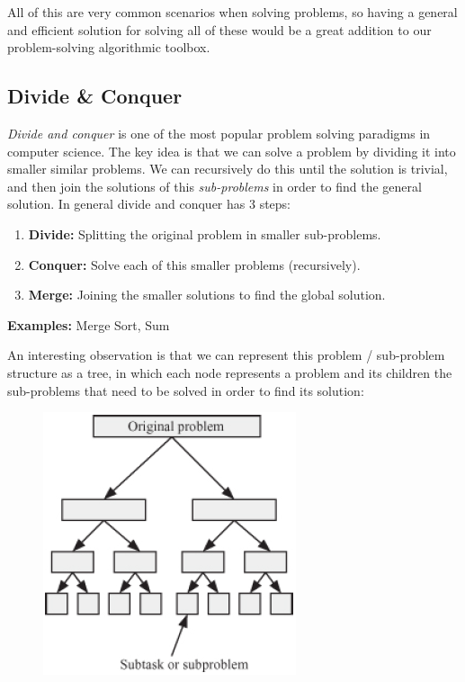 \documentclass{article}
\begin{document}
All of this are very common scenarios when solving problems, so having a general and efficient solution for solving all of these would be a great addition to our problem-solving algorithmic toolbox.

\subsection{Divide \& Conquer}

\textit{Divide and conquer} is one of the most popular problem solving paradigms in computer science. The key idea is that we can solve a problem by dividing it into smaller similar problems. We can recursively do this until the solution is trivial, and then join the solutions of this \textit{sub-problems} in order to find the general solution. In general divide and conquer has 3 steps:

\begin{enumerate}
	\item \textbf{Divide:} Splitting the original problem in smaller sub-problems.
	\item \textbf{Conquer:} Solve each of this smaller problems (recursively).
	\item \textbf{Merge:} Joining the smaller solutions to find the global solution.
\end{enumerate}

\textbf{Examples:} Merge Sort, Sum

An interesting observation is that we can represent this problem / sub-problem structure as a tree, in which each node represents a problem and its children the sub-problems that need to be solved in order to find its solution:

\begin{figure}[H]
	\centering
	\includegraphics[width=0.5\linewidth]{images/divideandconquer}
\end{figure}
\end{document}
